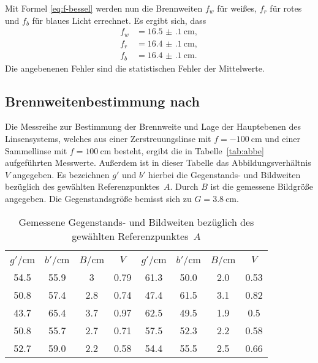 %
Mit Formel \eqref{eq:f-bessel} werden nun die Brennweiten $f_w$ für
weißes, $f_r$ für rotes und $f_b$ für blaues Licht errechnet.  Es ergibt
sich, dass
%
\begin{align*}
f _w &= \SI{16.5(1)}{\centi\metre}, \\
f _r &= \SI{16.4(1)}{\centi\metre}, \\
f _b &= \SI{16.4(1)}{\centi\metre}.
\end{align*}
%
Die angebenenen Fehler sind die statistischen Fehler der Mittelwerte.
%
\subsection{Brennweitenbestimmung nach }

Die Messreihe zur Bestimmung der Brennweite und Lage der Hauptebenen des
Linsensystems, welches aus einer Zerstreuungslinse mit $f =
\SI{-100}{\centi\metre}$ und einer Sammellinse mit $f =
\SI{100}{\centi\metre}$ besteht, ergibt die in Tabelle~\vref{tab:abbe}
aufgeführten Messwerte. Außerdem ist in dieser Tabelle das
Abbildungsverhältnis $V$ angegeben. Es bezeichnen $g'$ und $b'$ hierbei
die Gegenstands- und Bildweiten bezüglich des gewählten
Referenzpunktes~$A$. Durch $B$ ist die gemessene Bildgröße
angegeben. Die Gegenstandsgröße bemisst sich zu $G =
\SI{3.8}{\centi\metre}$.
%
\begin{table}
  \centering\footnotesize
  \begin{tabular}{SSSSSSSS}
    \toprule
    {$g'$/\si{\centi\metre}} & {$b'$/\si{\centi\metre}} &
    {$B$/}\si{\centi\metre} & {$V$} &
    {$g'$/}\si{\centi\metre}& {$b'$/}\si{\centi\metre}&
    {$B$/}\si{\centi\metre} & {$V$}\\
    \cmidrule(r){1-4}\cmidrule(l){5-8}
    54.5&55.9&3&0.79&61.3&50.0&2.0&0.53\\
    50.8&57.4&2.8&0.74&47.4&61.5&3.1&0.82\\
    43.7&65.4&3.7&0.97&62.5&49.5&1.9&0.5\\
    50.8&55.7&2.7&0.71&57.5&52.3&2.2&0.58\\
    52.7&59.0&2.2&0.58&54.4&55.5&2.5&0.66\\
    \bottomrule
  \end{tabular}
  \caption{Gemessene Gegenstands- und Bildweiten bezüglich des gewählten
    Referenzpunktes~$A$}
  \label{tab:abbe}
\end{table}

